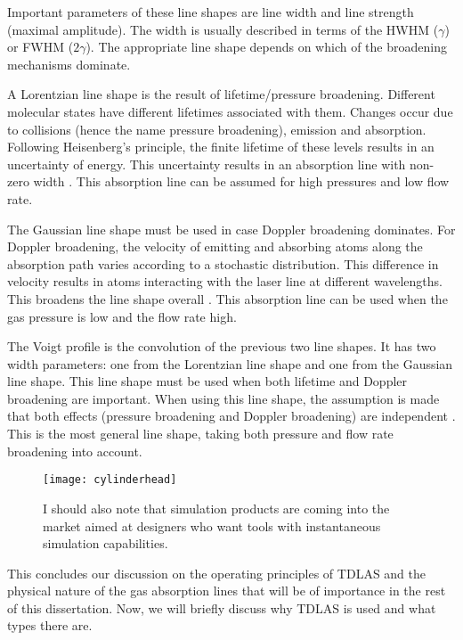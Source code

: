 \documentclass[\home/main.tex]{subfiles}
\begin{document}
  Important parameters of these line shapes are line width and line strength (maximal amplitude). The width is usually described in terms of the \acrfull{HWHM} ($\gamma$) or \acrfull{FWHM} ($2\gamma$). The appropriate line shape depends on which of the broadening mechanisms dominate.
  
  A Lorentzian line shape is the result of lifetime/pressure broadening. Different molecular states have different lifetimes associated with them. Changes occur due to collisions (hence the name pressure broadening), emission and absorption. Following Heisenberg's principle, the finite lifetime of these levels results in an uncertainty of energy. This uncertainty results in an absorption line with non-zero width \cite{spectrochemical-analysis}. This absorption line can be assumed for high pressures and low flow rate.
  
  The Gaussian line shape must be used in case Doppler broadening dominates. For Doppler broadening, the velocity of emitting and absorbing atoms along the absorption path varies according to a stochastic distribution. This difference in velocity results in atoms interacting with the laser line at different wavelengths. This broadens the line shape overall \cite{spectrochemical-analysis}. This absorption line can be used when the gas pressure is low and the flow rate high.
  
  The Voigt profile is the convolution of the previous two line shapes. It has two width parameters: one from the Lorentzian line shape and one from the Gaussian line shape. This line shape must be used when both lifetime and Doppler broadening are important. When using this line shape, the assumption is made that both effects (pressure broadening and Doppler broadening) are independent \cite{misunderstanding-voigt,spectrochemical-analysis}. This is the most general line shape, taking both pressure and flow rate broadening into account.
  
  \begin{figure}
    \texttt{[image: cylinderhead]}
    \caption{I should also note that simulation products are coming into the market aimed at designers who want tools with instantaneous simulation capabilities.}
  \end{figure}
  
  This concludes our discussion on the operating principles of \acrshort{TDLAS} and the physical nature of the gas absorption lines that will be of importance in the rest of this dissertation. Now, we will briefly discuss why \acrshort{TDLAS} is used and what types there are.
\end{document}
